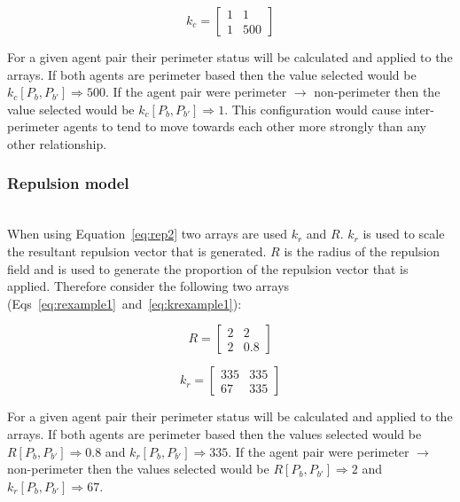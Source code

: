 \documentclass[12pt,a4paper]{IEEEtran}
\newcommand{\kc}{\mathit{k_c}}
\newcommand{\kr}{\mathit{k_r}}
\newcommand{\rb}{\mathit{R}}
\begin{document}
\begin{equation}\label{eq:kcexample1}
	\kc = 
	\begin{bmatrix}
	1 & 1\\
	1 & 500
	\end{bmatrix}
\end{equation}

For a given agent pair their perimeter status will be calculated and applied to the arrays. If both agents are perimeter based then the value selected would be $k_c[P_b,P_{b'}]\Rightarrow 500$. If the agent pair were perimeter $\rightarrow$ non-perimeter then the value selected would be $k_c[P_b,P_{b'}]\Rightarrow 1$. This configuration would cause inter-perimeter agents to tend to move towards each other more strongly than any other relationship.

\subsubsection{Repulsion model}~\\
When using Equation~\ref{eq:rep2} two arrays are used $\kr$ and $\rb$. $\kr$ is used to scale the resultant repulsion vector that is generated. $\rb$ is the radius of the repulsion field and is used to generate the proportion of the repulsion vector that is applied. Therefore consider the following two arrays (Eqs~\ref{eq:rexample1}~and~\ref{eq:krexample1}):

\begin{equation}\label{eq:rexample1}
	\rb = 
	\begin{bmatrix}
	2 & 2\\
	2 & 0.8
	\end{bmatrix}
\end{equation}

\begin{equation}\label{eq:krexample1}
	\kr = 
	\begin{bmatrix}
	335 & 335\\
	67 & 335
	\end{bmatrix}
\end{equation}

For a given agent pair their perimeter status will be calculated and applied to the arrays. If both agents are perimeter based then the values selected would be $\rb[P_b,P_{b'}]\Rightarrow 0.8$ and $\kr[P_b,P_{b'}]\Rightarrow 335$. If the agent pair were perimeter $\rightarrow$ non-perimeter then the values selected would be $\rb[P_b,P_{b'}]\Rightarrow 2$ and $\kr[P_b,P_{b'}]\Rightarrow 67$.\\
\end{document}
